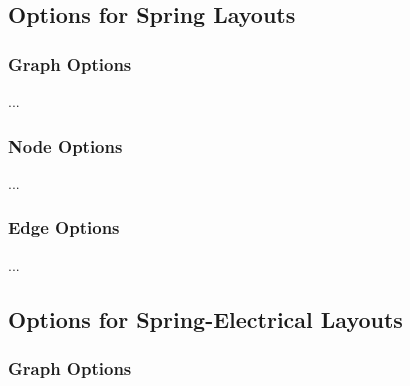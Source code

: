 \subsection{Options for Spring Layouts}

\subsubsection{Graph Options}

...

\subsubsection{Node Options}

...

\subsubsection{Edge Options}

...

\subsection{Options for Spring-Electrical Layouts}


\subsubsection{Graph Options}

